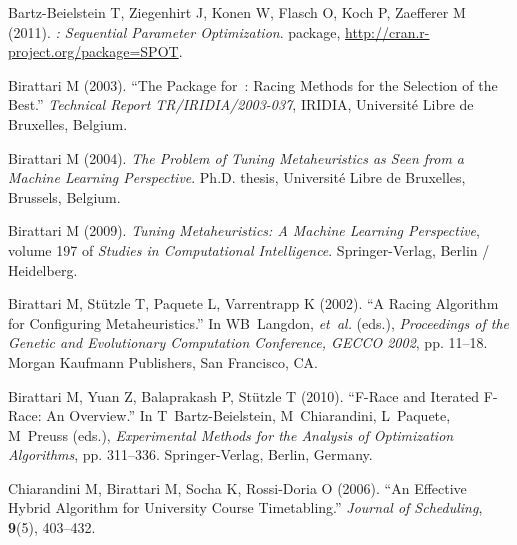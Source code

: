 \documentclass[article,a4paper,nojss,notitle]{jss}
\begin{document}
\begin{thebibliography}{34}
Bartz-Beielstein T, Ziegenhirt J, Konen W, Flasch O, Koch P, Zaefferer M
  (2011).
\newblock \emph{{}: Sequential Parameter Optimization}.
\newblock {} package,
  \urlprefix\url{http://cran.r-project.org/package=SPOT}.

Birattari M (2003).
\newblock \enquote{The {} Package for~: {R}acing
  Methods for the Selection of the Best.}
\newblock \emph{Technical Report TR/IRIDIA/2003-037}, IRIDIA, Universit{\'e}
  Libre de Bruxelles, Belgium.

Birattari M (2004).
\newblock \emph{The Problem of Tuning Metaheuristics as Seen from a Machine
  Learning Perspective}.
\newblock Ph.D. thesis, Universit{\'e} Libre de Bruxelles, Brussels, Belgium.

Birattari M (2009).
\newblock \emph{Tuning Metaheuristics: A Machine Learning Perspective}, volume
  197 of \emph{Studies in Computational Intelligence}.
\newblock Springer-Verlag, Berlin / Heidelberg.

Birattari M, St{\"u}tzle T, Paquete L, Varrentrapp K (2002).
\newblock \enquote{A Racing Algorithm for Configuring Metaheuristics.}
\newblock In WB~Langdon, \emph{et~al.} (eds.), \emph{Proceedings of the Genetic
  and Evolutionary Computation Conference, GECCO 2002}, pp. 11--18. Morgan
  Kaufmann Publishers, San Francisco, CA.

Birattari M, Yuan Z, Balaprakash P, St{\"u}tzle T (2010).
\newblock \enquote{{F}-Race and Iterated {F}-Race: An Overview.}
\newblock In T~Bartz-Beielstein, M~Chiarandini, L~Paquete, M~Preuss (eds.),
  \emph{Experimental Methods for the Analysis of Optimization Algorithms}, pp.
  311--336. Springer-Verlag, Berlin, Germany.

Chiarandini M, Birattari M, Socha K, Rossi-Doria O (2006).
\newblock \enquote{An Effective Hybrid Algorithm for University Course
  Timetabling.}
\newblock \emph{Journal of Scheduling}, \textbf{9}(5), 403--432.


\end{thebibliography}
\end{document}
